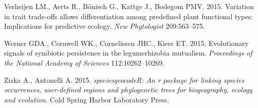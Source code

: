 \documentclass[author-year, review, 11pt]{components/elsarticle} %
\begin{document}
\hypertarget{ref-Verheijen_2015}{}
Verheijen LM., Aerts R., Bönisch G., Kattge J., Bodegom PMV. 2015.
Variation in trait trade-offs allows differentiation among predefined
plant functional types: Implications for predictive ecology. \emph{New
Phytologist} 209:563--575.

\hypertarget{ref-Werner_2015}{}
Werner GDA., Cornwell WK., Cornelissen JHC., Kiers ET. 2015.
Evolutionary signals of symbiotic persistence in the legumerhizobia
mutualism. \emph{Proceedings of the National Academy of Sciences}
112:10262--10269.

\hypertarget{ref-Zizka_2015}{}
Zizka A., Antonelli A. 2015. \emph{speciesgeocodeR: An r package for
linking species occurrences, user-defined regions and phylogenetic trees
for biogeography, ecology and evolution}. Cold Spring Harbor Laboratory
Press.
\end{document}
